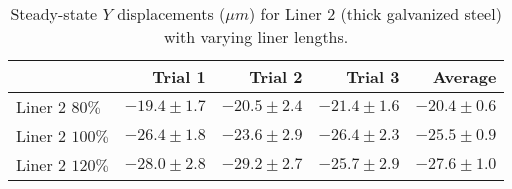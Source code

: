 \begin{table}[htbp!]
\centering
\begin{tabular}{lrrrr}
\toprule
  & Trial 1 & Trial 2 & Trial 3 & Average \\
\midrule
 Liner 2 $80\%$ & $-19.4 \pm 1.7$ & $-20.5 \pm 2.4$ & $-21.4 \pm 1.6$ & $-20.4 \pm 0.6$ \\
 Liner 2 $100\%$ & $-26.4 \pm 1.8$ & $-23.6 \pm 2.9$ & $-26.4 \pm 2.3$ & $-25.5 \pm 0.9$ \\
 Liner 2 $120\%$ & $-28.0 \pm 2.8$ & $-29.2 \pm 2.7$ & $-25.7 \pm 2.9$ & $-27.6 \pm 1.0$ \\
\bottomrule
\end{tabular}
\caption{Steady-state $Y$ displacements ($\mu m$) for Liner 2 (thick galvanized steel) with varying liner lengths.}
\label{fig:liner_2_results_table}
\end{table}